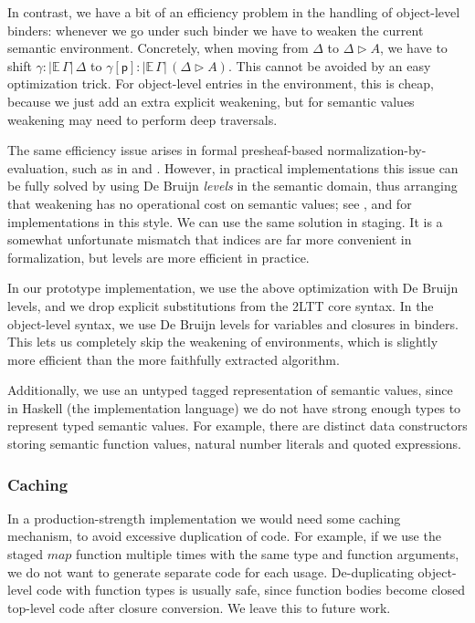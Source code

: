\documentclass[acmsmall,anonymous,review]{acmart}
\newcommand{\mit}[1]{\mathit{#1}}
\newcommand{\mbb}[1]{\mathbb{#1}}
\newcommand{\ext}{\triangleright}
\newcommand{\p}{\mathsf{p}}
\newcommand{\ev}{\mbb{E}}
\theoremstyle{remark}
\begin{document}
In contrast, we have a bit of an efficiency problem in the handling of
object-level binders: whenever we go under such binder we have to weaken the
current semantic environment. Concretely, when moving from $\Delta$ to
$\Delta \ext A$, we have to shift $\gamma : |\ev\,\Gamma|\,\Delta$ to
$\gamma[\p] : |\ev\,\Gamma|\,(\Delta \ext A)$. This cannot be avoided by an easy
optimization trick. For object-level entries in the environment, this is cheap,
because we just add an extra explicit weakening, but for semantic values
weakening may need to perform deep traversals.

The same efficiency issue arises in formal presheaf-based
normalization-by-evaluation, such as in \cite{kaposinbe} and
\cite{coquand2018canonicity}. However, in practical implementations this issue
can be fully solved by using De Bruijn \emph{levels} in the semantic domain,
thus arranging that weakening has no operational cost on semantic values; see
\cite{coquand1996algorithm}, \cite{modulartc} and \cite{untypedtc} for
implementations in this style. We can use the same solution in staging. It is a
somewhat unfortunate mismatch that indices are far more convenient in
formalization, but levels are more efficient in practice.

In our prototype implementation, we use the above optimization with De Bruijn
levels, and we drop explicit substitutions from the 2LTT core syntax. In the
object-level syntax, we use De Bruijn levels for variables and closures in
binders. This lets us completely skip the weakening of environments, which is
slightly more efficient than the more faithfully extracted algorithm.

Additionally, we use an untyped tagged representation of semantic
values, since in Haskell (the implementation language) we do not have
strong enough types to represent typed semantic values. For example, there
are distinct data constructors storing semantic function values, natural number
literals and quoted expressions.

\subsubsection{Caching} In a production-strength implementation we would need some
caching mechanism, to avoid excessive duplication of code. For example, if we
use the staged $\mit{map}$ function multiple times with the same type and
function arguments, we do not want to generate separate code for each
usage. De-duplicating object-level code with function types is usually safe,
since function bodies become closed top-level code after closure conversion. We
leave this to future work.
\end{document}

